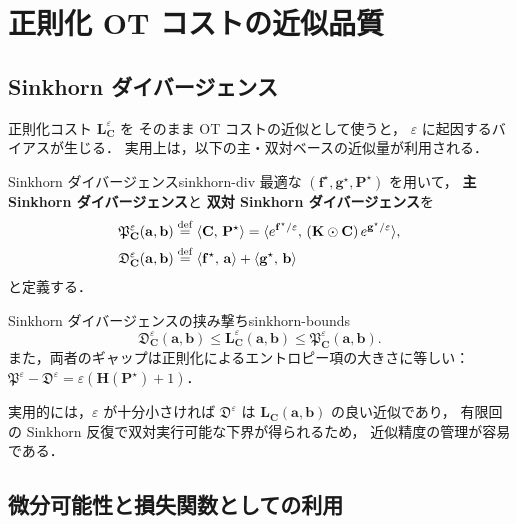 \section{正則化 OT コストの近似品質}\label{sec:approximation}

\subsection{Sinkhorn ダイバージェンス}\label{subsec:sinkhorn-divergence}

正則化コスト $\mathbf{L}^\varepsilon_{\mathbf{C}}$ を
そのまま OT コストの近似として使うと，
$\varepsilon$ に起因するバイアスが生じる．
実用上は，以下の主・双対ベースの近似量が利用される．

\begin{definition}{Sinkhorn ダイバージェンス}{sinkhorn-div}
最適な $(\mathbf{f}^\star, \mathbf{g}^\star, \mathbf{P}^\star)$ を用いて，
\textbf{主 Sinkhorn ダイバージェンス}と
\textbf{双対 Sinkhorn ダイバージェンス}を
\begin{align*}
  \mathfrak{P}^\varepsilon_{\mathbf{C}}(\mathbf{a}, \mathbf{b})
  &\overset{\mathrm{def}}{=} \langle \mathbf{C},\, \mathbf{P}^\star \rangle
  = \langle e^{\mathbf{f}^\star/\varepsilon},\, (\mathbf{K} \odot \mathbf{C})\,
    e^{\mathbf{g}^\star/\varepsilon} \rangle, \\
  \mathfrak{D}^\varepsilon_{\mathbf{C}}(\mathbf{a}, \mathbf{b})
  &\overset{\mathrm{def}}{=} \langle \mathbf{f}^\star,\, \mathbf{a} \rangle
  + \langle \mathbf{g}^\star,\, \mathbf{b} \rangle
\end{align*}
と定義する．
\end{definition}

\begin{proposition}{Sinkhorn ダイバージェンスの挟み撃ち}{sinkhorn-bounds}
\[
  \mathfrak{D}^\varepsilon_{\mathbf{C}}(\mathbf{a}, \mathbf{b})
  \leq \mathbf{L}^\varepsilon_{\mathbf{C}}(\mathbf{a}, \mathbf{b})
  \leq \mathfrak{P}^\varepsilon_{\mathbf{C}}(\mathbf{a}, \mathbf{b}).
\]
また，両者のギャップは正則化によるエントロピー項の大きさに等しい：
$\mathfrak{P}^\varepsilon - \mathfrak{D}^\varepsilon
= \varepsilon(\mathbf{H}(\mathbf{P}^\star) + 1)$．
\end{proposition}

実用的には，$\varepsilon$ が十分小さければ
$\mathfrak{D}^\varepsilon$ は
$\mathbf{L_C}(\mathbf{a}, \mathbf{b})$ の良い近似であり，
有限回の Sinkhorn 反復で双対実行可能な下界が得られるため，
近似精度の管理が容易である．

\subsection{微分可能性と損失関数としての利用}\label{subsec:differentiability}

